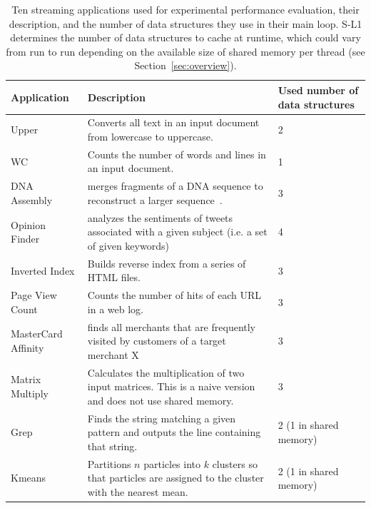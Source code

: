 \begin{table}[ht]
{
\begin{center}
\resizebox{16cm}{1.9cm}
{
  \begin{tabular}{|p{2.8cm}|p{14.4cm}|p{3.5cm}|} \hline
         {\bf Application} & {\bf Description} &  {\bf Used number of data structures}\\
\hline
	  {Upper} &   {Converts all text in an input document from lowercase to uppercase.} &  {2}\\  \hline
	  {WC} &   {Counts the number of words and lines in an input document.} &  {1}\\ \hline
	  {DNA Assembly} & {merges fragments of a DNA sequence to reconstruct a larger sequence~\cite{dnaassembly}.} & {3}\\ \hline
	  {Opinion Finder} & {analyzes the sentiments of tweets associated with a given subject (i.e. a set of given keywords)~\cite{wilson2005opinionfinder}} &  {4}\\ \hline
	  {Inverted Index} & {Builds reverse index from a series of HTML files.} & {3}\\ \hline
	  {Page View Count} & {Counts the number of hits of each URL in a web log.} & {3}\\ \hline
          {MasterCard Affinity} & {finds all merchants that are frequently visited by customers of a target merchant X~\cite{mokhtari2014bigkernel}} & {3}\\ \hline
	  {Matrix Multiply} & {Calculates the multiplication of two input matrices. This is a naive version and does not use shared memory.} & {3}\\ \hline
	  {Grep} & {Finds the string matching a given pattern and outputs the line containing that string.} & {2 (1 in shared memory)}\\ \hline
	  {Kmeans} & {Partitions $n$ particles into $k$ clusters so that particles are assigned to the cluster with the nearest mean.} & {2 (1 in shared memory)}\\ \hline
  \end{tabular}
}
\end{center}
}
\vspace{-0.1cm}
\caption{\footnotesize\textnormal{Ten streaming applications used for experimental performance evaluation, their
description, and the number of data structures they use in their main loop. S-L1 determines the number of data
structures to cache at runtime, which could vary from run to run depending on the available size of shared memory per
thread (see Section~\ref{sec:overview}).}} %
\label{tab:apps}
\vspace{-0.0cm}
\end{table}

